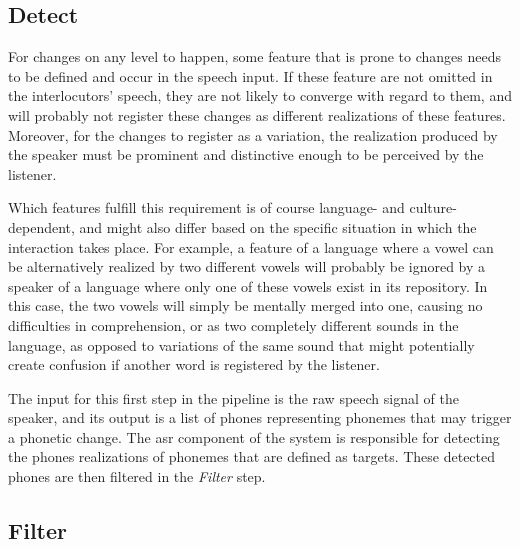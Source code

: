 \subsection{Detect}
\label{subsec:detect}

For changes on any level to happen, some feature that is prone to changes needs to be defined and occur in the speech input.
If these feature are not omitted in the interlocutors' speech, they are not likely to converge with regard to them, and will probably not register these changes as different realizations of these features.
Moreover, for the changes to register as a variation, the realization produced by the speaker must be prominent and distinctive enough to be perceived by the listener.

Which features fulfill this requirement is of course language- and culture-dependent, and might also differ based on the specific situation in which the interaction takes place.
For example, a feature of a language where a vowel can be alternatively realized by two different vowels will probably be ignored by a speaker of a language where only one of these vowels exist in its repository.
In this case, the two vowels will simply be mentally merged into one, causing no difficulties in comprehension, or as two completely different sounds in the language, as opposed to variations of the same sound that might potentially create confusion if another word is registered by the listener.

The input for this first step in the pipeline is the raw speech signal of the speaker, and its output is a list of phones representing phonemes that may trigger a phonetic change.
The \ac{asr} component of the system is responsible for detecting the phones realizations of phonemes that are defined as targets.
These detected phones are then filtered in the \textit{Filter} step.

\subsection{Filter}
\label{subsec:filter}

